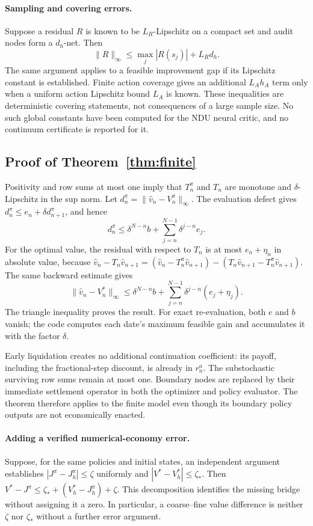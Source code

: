 \paragraph{Sampling and covering errors.}
Suppose a residual $R$ is known to be $L_R$-Lipschitz on a compact set and audit nodes form a $d_h$-net. Then
\[
\|R\|_\infty\leq\max_j|R(s_j)|+L_Rd_h.
\]
The same argument applies to a feasible improvement gap if its Lipschitz constant is established. Finite action coverage gives an additional $L_A h_A$ term only when a uniform action Lipschitz bound $L_A$ is known. These inequalities are deterministic covering statements, not consequences of a large sample size. No such global constants have been computed for the NDU neural critic, and no continuum certificate is reported for it.

\subsection{Proof of Theorem~\ref{thm:finite}}
Positivity and row sums at most one imply that $T_n^\pi$ and $T_n$ are monotone and $\delta$-Lipschitz in the sup norm. Let $d_n^\pi=\|\widehat v_n-V_n^\pi\|_\infty$. The evaluation defect gives
$d_n^\pi\leq e_n+\delta d_{n+1}^\pi$, and hence
\[
d_n^\pi\leq\delta^{N-n}b+\sum_{j=n}^{N-1}\delta^{j-n}e_j.
\]
For the optimal value, the residual with respect to $T_n$ is at most $e_n+\eta_n$ in absolute value, because
$\widehat v_n-T_n\widehat v_{n+1}=(\widehat v_n-T_n^\pi\widehat v_{n+1})-(T_n\widehat v_{n+1}-T_n^\pi\widehat v_{n+1})$.
The same backward estimate gives
\[
\|\widehat v_n-V_n^*\|_\infty\leq\delta^{N-n}b+
\sum_{j=n}^{N-1}\delta^{j-n}(e_j+\eta_j).
\]
The triangle inequality proves the result. For exact re-evaluation, both $e$ and $b$ vanish; the code computes each date's maximum feasible gain and accumulates it with the factor $\delta$.

Early liquidation creates no additional continuation coefficient: its payoff, including the fractional-step discount, is already in $r_n^a$. The substochastic surviving row sums remain at most one. Boundary nodes are replaced by their immediate settlement operator in both the optimizer and policy evaluator. The theorem therefore applies to the finite model even though its boundary policy outputs are not economically enacted.

\paragraph{Adding a verified numerical-economy error.}
Suppose, for the same policies and initial states, an independent argument establishes $|J^\pi-J_h^\pi|\leq\zeta$ uniformly and $|V^*-V_h^*|\leq\zeta_*$. Then
$V^*-J^\pi\leq\zeta_*+(V_h^*-J_h^\pi)+\zeta$. This decomposition identifies the missing bridge without assigning it a zero. In particular, a coarse--fine value difference is neither $\zeta$ nor $\zeta_*$ without a further error argument.

